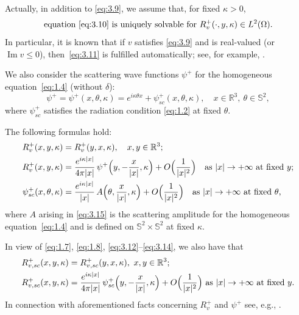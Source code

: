 \documentclass[JEP,XML,SOM,Unicode,NoEqCountersInSection,published]{cedram}
\let\ra\rightarrow
\newcommand{\RR}{\mathbb R}
\renewcommand{\Im}{\mathop{\mathrm{Im}}}
\theoremstyle{definition}
\begin{document}
Actually, in addition to \eqref{eq:3.9}, we assume that, for fixed $\kappa>0$,
\begin{equation}
\label{eq:3.11}
\mbox{equation}\ \eqref{eq:3.10}\ \mbox{is\ uniquely\ solvable\ for}\ R_v^+(\cdot , y, \kappa) \in L^2(\Omega).
\end{equation}
In particular, it is known that if $v$ satisfies \eqref{eq:3.9} and is real-valued (or $\Im v \leq 0$), then~\eqref{eq:3.11} is fulfilled automatically;
see, for example, \cite{CK}.

We also consider the scattering wave functions $\psi^+$ for the homogeneous equation~\eqref{eq:1.4} (\ie without $\delta$):
\begin{equation}
\label{eq:3.12}
\psi^+=\psi^+(x,\theta,\kappa)=e^{i \kappa\theta x}+\psi^+_{sc}(x,\theta,\kappa),\quad x \in \RR^3,\ \theta \in \mathbb S^2,
\end{equation}
where $\psi^+_{sc}$ satisfies the radiation condition \eqref{eq:1.2} at fixed $\theta$.

The following formulas hold:
\begin{align}
\label{eq:3.13}
R_v^+(x, y, \kappa)&=R_v^+(y, x, \kappa),\quad x, y\in \RR^3;
\\
\label{eq:3.14}
R_v^+(x, y, \kappa)&=\frac{e^{i\kappa|x|}}{4\pi|x|}\,\psi^+\Bigl(y, -\frac{x}{|x|},\kappa\Bigr)+ O\Bigl(\frac{1}{|x|^2}\Bigr) \quad \mbox{as} \ |x|\ra +\infty\text{ at fixed $y$;}\\
\label{eq:3.15}
\psi^+_{sc}(x,\theta,\kappa)&=\frac{e^{i\kappa|x|}}{|x|}\,A\Bigl(\theta, \frac{x}{|x|},\kappa\Bigr)+ O\Bigl(\frac{1}{|x|^2}\Bigr) \quad \mbox{as} \ |x|\ra +\infty\text{ at fixed $\theta$,}
\end{align}
where $A$ arising in \eqref{eq:3.15} is the scattering amplitude for the homogeneous equation~\eqref{eq:1.4}
and is defined on $\mathbb S^2 \times \mathbb S^2$ at fixed $\kappa$.

In view of \eqref{eq:1.7}, \eqref{eq:1.8}, \eqref{eq:3.12}--\eqref{eq:3.14}, we also have that
\begin{align}
\label{eq:3.16}
R_{v,sc}^+(x, y, \kappa)&=R_{v,sc}^+(y, x, \kappa),\ x, y\in \RR^3;
\\
\label{eq:3.17}
R_{v,sc}^+(x, y, \kappa)&=\frac{e^{i\kappa|x|}}{4\pi|x|}\,\psi_{sc}^+\Bigl(y, -\frac{x}{|x|},\kappa\Bigr)+ O\Bigl(\frac{1}{|x|^2}\Bigr) \ \mbox{as} \ |x|\ra +\infty\text{ at fixed $y$.}
\end{align}
In connection with aforementioned facts concerning $R_v^+$ and $\psi^+$ see, e.g., \cite[Chap.\,IV, \S1]{FM}.
\end{document}
